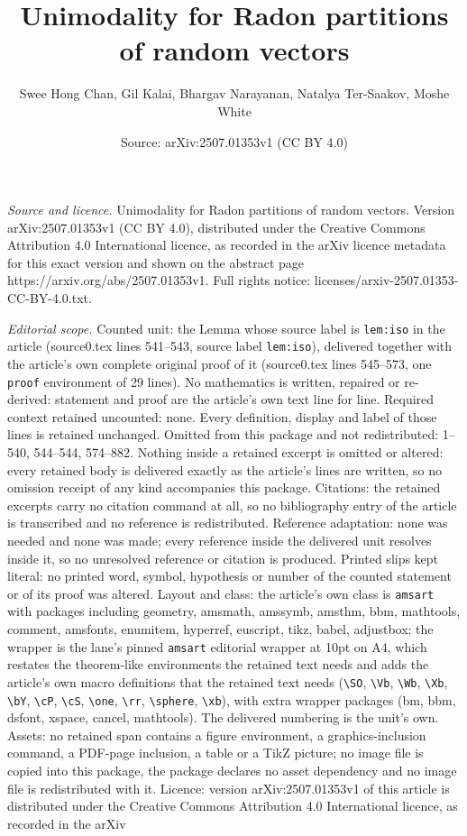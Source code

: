 \documentclass[10pt,a4paper]{amsart}
\title[Unimodality for Radon partitions of random vectors]{Unimodality for Radon partitions of random vectors}
\author{Swee Hong Chan, Gil Kalai, Bhargav Narayanan, Natalya Ter-Saakov, Moshe White}
\date{Source: arXiv:2507.01353v1 (CC BY 4.0)}
\begin{document}
\maketitle

\noindent\emph{Source and licence.} Unimodality for Radon partitions of random vectors. Version arXiv:2507.01353v1 (CC BY 4.0), distributed under the Creative Commons Attribution 4.0 International licence, as recorded in the arXiv licence metadata for this exact version and shown on the abstract page https://arxiv.org/abs/2507.01353v1. Full rights notice: licenses/arxiv-2507.01353-CC-BY-4.0.txt.\par\smallskip

\noindent\textit{Editorial scope.} Counted unit: the Lemma whose source label is \texttt{lem:iso} in the article (source0.tex lines 541--543, source label \texttt{lem:iso}), delivered together with the article's own complete original proof of it (source0.tex lines 545--573, one \texttt{proof} environment of 29 lines). No mathematics is written, repaired or re-derived: statement and proof are the article's own text line for line. Required context retained uncounted: none. Every definition, display and label of those lines is retained unchanged. Omitted from this package and not redistributed: 1--540, 544--544, 574--882. Nothing inside a retained excerpt is omitted or altered: every retained body is delivered exactly as the article's lines are written, so no omission receipt of any kind accompanies this package. Citations: the retained excerpts carry no citation command at all, so no bibliography entry of the article is transcribed and no reference is redistributed. Reference adaptation: none was needed and none was made; every reference inside the delivered unit resolves inside it, so no unresolved reference or citation is produced. Printed slips kept literal: no printed word, symbol, hypothesis or number of the counted statement or of its proof was altered. Layout and class: the article's own class is \texttt{amsart} with packages including geometry, amsmath, amssymb, amsthm, bbm, mathtools, comment, amsfonts, enumitem, hyperref, euscript, tikz, babel, adjustbox; the wrapper is the lane's pinned \texttt{amsart} editorial wrapper at 10pt on A4, which restates the theorem-like environments the retained text needs and adds the article's own macro definitions that the retained text needs (\texttt{\textbackslash SO}, \texttt{\textbackslash Vb}, \texttt{\textbackslash Wb}, \texttt{\textbackslash Xb}, \texttt{\textbackslash bY}, \texttt{\textbackslash cP}, \texttt{\textbackslash cS}, \texttt{\textbackslash one}, \texttt{\textbackslash rr}, \texttt{\textbackslash sphere}, \texttt{\textbackslash xb}), with extra wrapper packages (bm, bbm, dsfont, xspace, cancel, mathtools). The delivered numbering is the unit's own. Assets: no retained span contains a figure environment, a graphics-inclusion command, a PDF-page inclusion, a table or a TikZ picture; no image file is copied into this package, the package declares no asset dependency and no image file is redistributed with it. Licence: version arXiv:2507.01353v1 of this article is distributed under the Creative Commons Attribution 4.0 International licence, as recorded in the arXiv 
\end{document}
